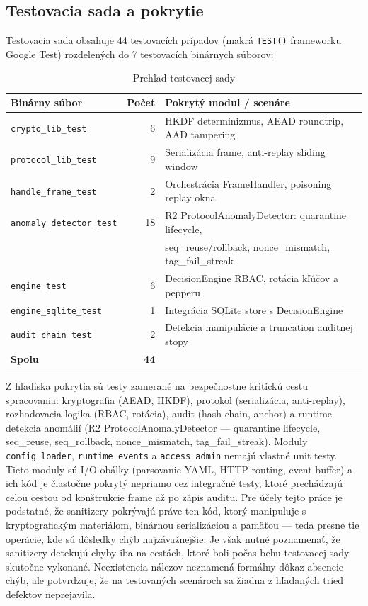 \documentclass[journal,a4paper,onecolumn]{IEEEtran}
\begin{document}
\subsection{Testovacia sada a pokrytie}

Testovacia sada obsahuje 44 testovacích prípadov (makrá \texttt{TEST()} frameworku Google Test) rozdelených do 7 testovacích binárnych súborov:

\begin{table}[h]
\centering
\caption{Prehľad testovacej sady}
\label{tab:test-suite}
\begin{tabular}{lrl}
\hline
\textbf{Binárny súbor} & \textbf{Počet} & \textbf{Pokrytý modul / scenáre} \\
\hline
\texttt{crypto\_lib\_test} & 6 & HKDF determinizmus, AEAD roundtrip, AAD tampering \\
\texttt{protocol\_lib\_test} & 9 & Serializácia frame, anti-replay sliding window \\
\texttt{handle\_frame\_test} & 2 & Orchestrácia FrameHandler, poisoning replay okna \\
\texttt{anomaly\_detector\_test} & 18 & R2 ProtocolAnomalyDetector: quarantine lifecycle, \\
 & & seq\_reuse/rollback, nonce\_mismatch, tag\_fail\_streak \\
\texttt{engine\_test} & 6 & DecisionEngine RBAC, rotácia kľúčov a pepperu \\
\texttt{engine\_sqlite\_test} & 1 & Integrácia SQLite store s DecisionEngine \\
\texttt{audit\_chain\_test} & 2 & Detekcia manipulácie a truncation auditnej stopy \\
\hline
\textbf{Spolu} & \textbf{44} & \\
\hline
\end{tabular}
\end{table}

Z hľadiska pokrytia sú testy zamerané na bezpečnostne kritickú cestu spracovania: kryptografia (AEAD, HKDF), protokol (serializácia, anti-replay), rozhodovacia logika (RBAC, rotácia), audit (hash chain, anchor) a runtime detekcia anomálií (R2 ProtocolAnomalyDetector --- quarantine lifecycle, seq\_reuse, seq\_rollback, nonce\_mismatch, tag\_fail\_streak). Moduly \texttt{config\_loader}, \texttt{runtime\_events} a \texttt{access\_admin} nemajú vlastné unit testy. Tieto moduly sú I/O obálky (parsovanie YAML, HTTP routing, event buffer) a ich kód je čiastočne pokrytý nepriamo cez integračné testy, ktoré prechádzajú celou cestou od konštrukcie frame až po zápis auditu. Pre účely tejto práce je podstatné, že sanitizery pokrývajú práve ten kód, ktorý manipuluje s kryptografickým materiálom, binárnou serializáciou a pamäťou --- teda presne tie operácie, kde sú dôsledky chýb najzávažnejšie. Je však nutné poznamenať, že sanitizery detekujú chyby iba na cestách, ktoré boli počas behu testovacej sady skutočne vykonané. Neexistencia nálezov neznamená formálny dôkaz absencie chýb, ale potvrdzuje, že na testovaných scenároch sa žiadna z hľadaných tried defektov neprejavila.
\end{document}
